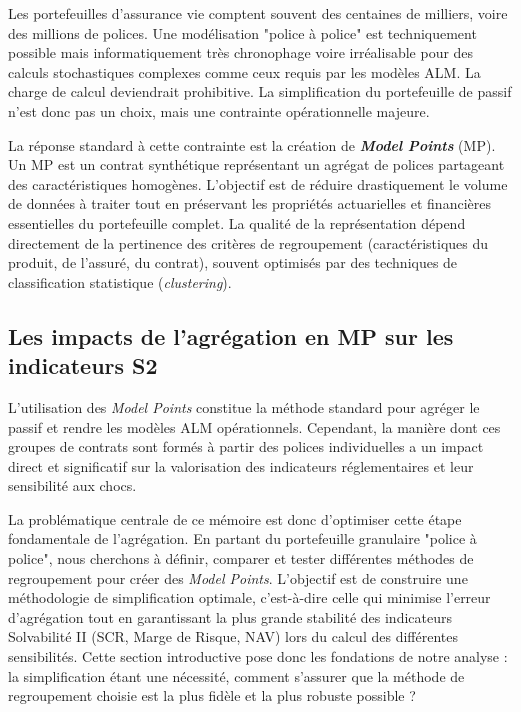 Les portefeuilles d'assurance vie comptent souvent des centaines de milliers, voire des millions de polices. Une modélisation "police à police" est techniquement possible mais informatiquement très chronophage voire irréalisable pour des calculs stochastiques complexes comme ceux requis par les modèles ALM. La charge de calcul deviendrait prohibitive. La simplification du portefeuille de passif n'est donc pas un choix, mais une contrainte opérationnelle majeure.



La réponse standard à cette contrainte est la création de \textbf{\textit{Model Points}} (MP). Un MP est un contrat synthétique représentant un agrégat de polices partageant des caractéristiques homogènes. L'objectif est de réduire drastiquement le volume de données à traiter tout en préservant les propriétés actuarielles et financières essentielles du portefeuille complet. La qualité de la représentation dépend directement de la pertinence des critères de regroupement (caractéristiques du produit, de l'assuré, du contrat), souvent optimisés par des techniques de classification statistique (\textit{clustering}).

\subsection{Les impacts de l'agrégation en MP sur les indicateurs S2}

L'utilisation des \textit{Model Points} constitue la méthode standard pour agréger le passif et rendre les modèles ALM opérationnels. Cependant, la manière dont ces groupes de contrats sont formés à partir des polices individuelles a un impact direct et significatif sur la valorisation des indicateurs réglementaires et leur sensibilité aux chocs.



La problématique centrale de ce mémoire est donc d'optimiser cette étape fondamentale de l'agrégation. En partant du portefeuille granulaire "police à police", nous cherchons à définir, comparer et tester différentes méthodes de regroupement pour créer des \textit{Model Points}. L'objectif est de construire une méthodologie de simplification optimale, c'est-à-dire celle qui minimise l'erreur d'agrégation tout en garantissant la plus grande stabilité des indicateurs Solvabilité II (SCR, Marge de Risque, NAV) lors du calcul des différentes sensibilités. Cette section introductive pose donc les fondations de notre analyse : la simplification étant une nécessité, comment s'assurer que la méthode de regroupement choisie est la plus fidèle et la plus robuste possible ?
